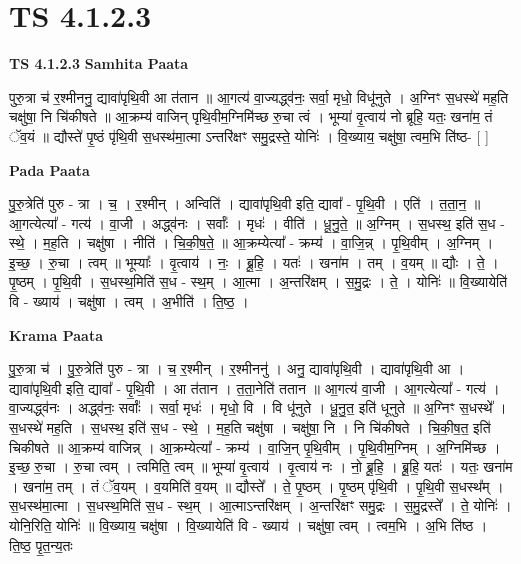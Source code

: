 \documentclass[17pt]{extarticle}
\begin{document}
\section{ TS 4.1.2.3 }

\textbf{TS 4.1.2.3 } \newline
\textbf{Samhita Paata} \newline

पुरु॒त्रा च॑ र॒श्मीननु॒ द्यावा॑पृथि॒वी आ त॑तान ॥ आ॒गत्य॑ वा॒ज्यद्ध्व॑नः॒ सर्वा॒ मृधो॒ विधू॑नुते । अ॒ग्निꣳ स॒धस्थे॑ मह॒ति चक्षु॑षा॒ नि चि॑कीषते ॥ आ॒क्रम्य॑ वाजिन् पृथि॒वीम॒ग्निमि॑च्छ रु॒चा त्वं । भूम्या॑ वृ॒त्वाय॑ नो ब्रूहि॒ यतः॒ खना॑म॒ तं ॅव॒यं ॥ द्यौस्ते॑ पृ॒ष्ठं पृ॑थि॒वी स॒धस्थ॑मा॒त्मा ऽन्तरि॑क्षꣳ समु॒द्रस्ते॒ योनिः॑ । वि॒ख्याय॒ चक्षु॑षा॒ त्वम॒भि ति॑ष्ठ- [  ] \newline

\textbf{Pada Paata} \newline

पु॒रु॒त्रेति॑ पुरु - त्रा । च॒ । र॒श्मीन् । अन्विति॑ । द्यावा॑पृथि॒वी इति॒ द्यावा᳚ - पृ॒थि॒वी । एति॑ । त॒ता॒न॒ ॥ आ॒गत्येत्या᳚ - गत्य॑ । वा॒जी । अद्ध्व॑नः । सर्वाः᳚ । मृधः॑ । वीति॑ । धू॒नु॒ते॒ ॥ अ॒ग्निम् । स॒धस्थ॒ इति॑ स॒ध - स्थे॒ । म॒ह॒ति । चक्षु॑षा । नीति॑ । चि॒की॒ष॒ते॒ ॥ आ॒क्रम्येत्या᳚ - क्रम्य॑ । वा॒जि॒न्न् । पृ॒थि॒वीम् । अ॒ग्निम् । इ॒च्छ॒ । रु॒चा । त्वम् ॥ भूम्याः᳚ । वृ॒त्वाय॑ । नः॒ । ब्रू॒हि॒ । यतः॑ । खना॑म । तम् । व॒यम् ॥ द्यौः । ते॒ । पृ॒ष्ठम् । पृ॒थि॒वी । स॒धस्थ॒मिति॑ स॒ध - स्थ॒म् । आ॒त्मा । अ॒न्तरि॑क्षम् । स॒मु॒द्रः । ते॒ । योनिः॑ ॥ वि॒ख्यायेति॑ वि - ख्याय॑ । चक्षु॑षा । त्वम् । अ॒भीति॑ । ति॒ष्ठ॒ ।  \newline


\textbf{Krama Paata} \newline

पु॒रु॒त्रा च॑ । पु॒रु॒त्रेति॑ पुरु - त्रा । च॒ र॒श्मीन् । र॒श्मीननु॑ । अनु॒ द्यावा॑पृथि॒वी । द्यावा॑पृथि॒वी आ । द्यावा॑पृथि॒वी इति॒ द्यावा᳚ - पृ॒थि॒वी । आ त॑तान । त॒ता॒नेति॑ ततान ॥ आ॒गत्य॑ वा॒जी । आ॒गत्येत्या᳚ - गत्य॑ । वा॒ज्यद्ध्व॑नः । अद्ध्व॑नः॒ सर्वाः᳚ । सर्वा॒ मृधः॑ । मृधो॒ वि । वि धू॑नुते । धू॒नु॒त॒ इति॑ धूनुते ॥ 
अ॒ग्निꣳ स॒धस्थे᳚ । स॒धस्थे॑ मह॒ति । स॒धस्थ॒ इति॑ स॒ध - स्थे॒ । म॒ह॒ति चक्षु॑षा । चक्षु॑षा॒ नि । नि चि॑कीषते । चि॒की॒ष॒त॒ इति॑ चिकीषते ॥ आ॒क्रम्य॑ वाजिन्न् । आ॒क्रम्येत्या᳚ - क्रम्य॑ । वा॒जि॒न् पृ॒थि॒वीम् । पृ॒थि॒वीम॒ग्निम् । अ॒ग्निमि॑च्छ । इ॒च्छ॒ रु॒चा । रु॒चा त्वम् । त्वमिति॒ त्वम् ॥ भूम्या॑ वृ॒त्वाय॑ । वृ॒त्वाय॑ नः । नो॒ ब्रू॒हि॒ । ब्रू॒हि॒ यतः॑ । यतः॒ खना॑म । खना॑म॒ तम् । तं ॅव॒यम् । व॒यमिति॑ व॒यम् ॥ द्यौस्ते᳚ । ते॒ पृ॒ष्ठम् । पृ॒ष्ठम् पृ॑थि॒वी । पृ॒थि॒वी स॒धस्थ᳚म् । स॒धस्थ॑मा॒त्मा । स॒धस्थ॒मिति॑ स॒ध - स्थ॒म् । आ॒त्माऽन्तरि॑क्षम् । अ॒न्तरि॑क्षꣳ समु॒द्रः । स॒मु॒द्रस्ते᳚ । ते॒ योनिः॑ । योनि॒रिति॒ योनिः॑ ॥ वि॒ख्याय॒ चक्षु॑षा । वि॒ख्यायेति॑ वि - ख्याय॑ । चक्षु॑षा॒ त्वम् । त्वम॒भि । अ॒भि ति॑ष्ठ । ति॒ष्ठ॒ पृ॒त॒न्य॒तः \newline
\end{document}

